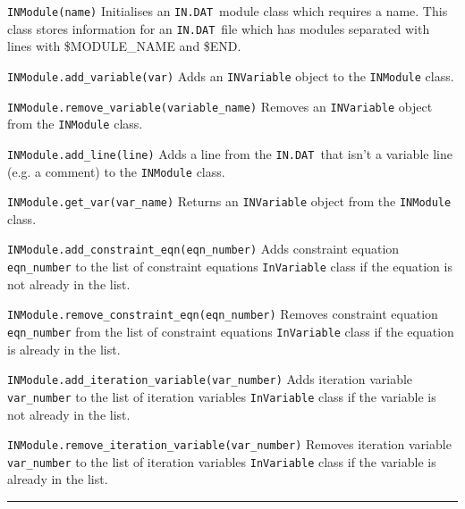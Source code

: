\documentclass[11pt,a4paper]{report}
\newcommand{\indat}{\mbox{\texttt{IN.DAT}}}
\begin{document}
\begin{description}

\item{\verb|INModule(name)|} Initialises an \indat\ module class which
  requires a name. This class stores information for an \indat\ file which has
  modules separated with lines with \$MODULE\_NAME and \$END.

\item{\verb|INModule.add_variable(var)|} Adds an \verb|INVariable| object to
  the \verb|INModule| class.

\item{\verb|INModule.remove_variable(variable_name)|} Removes an
  \verb|INVariable| object from the \verb|INModule| class.

\item{\verb|INModule.add_line(line)|} Adds a line from the \indat\ that isn't
  a variable line (e.g. a comment) to the \verb|INModule| class.

\item{\verb|INModule.get_var(var_name)|} Returns an \verb|INVariable| object
  from the \verb|INModule| class.

\item{\verb|INModule.add_constraint_eqn(eqn_number)|} Adds constraint
  equation \verb|eqn_number| to the list of constraint equations
  \verb|InVariable| class if the equation is not already in the list.

\item{\verb|INModule.remove_constraint_eqn(eqn_number)|} Removes
  constraint equation \verb|eqn_number| from the list of constraint
  equations \verb|InVariable| class if the equation is already in the list.

\item{\verb|INModule.add_iteration_variable(var_number)|} Adds iteration
  variable \verb|var_number| to the list of iteration variables
  \verb|InVariable| class if the variable is not already in the list.

\item{\verb|INModule.remove_iteration_variable(var_number)|} Removes
  iteration variable \verb|var_number| to the list of iteration variables
  \verb|InVariable| class if the variable is already in the list.

\end{description}

\rule{\textwidth}{0.4pt}
\end{document}
